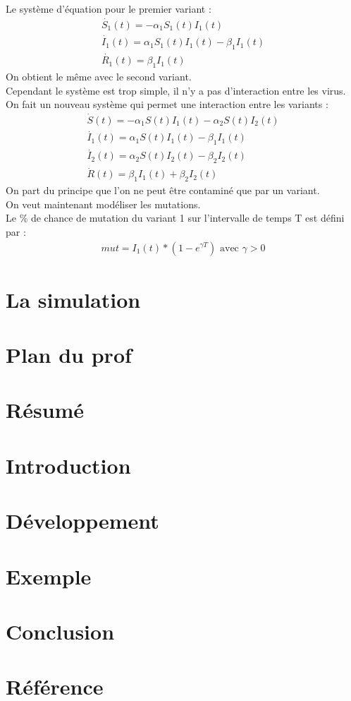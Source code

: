 \documentclass{article}
\begin{document}
Le système d'équation pour le premier variant : 
\begin{align}
    \dot{S_1}(t)= -\alpha_1 S_1(t)I_1(t) \\
    \dot{I_1}(t)= \alpha_1 S_1(t)I_1(t)-\beta_1 I_1(t) \\
    \dot{R_1}(t)= \beta_1 I_1(t)
\end{align}
On obtient le même avec le second variant. \\
Cependant le système est trop simple, il n'y a pas d'interaction entre les virus. \\
On fait un nouveau système qui permet une interaction entre les variants :
\begin{align}
    \dot{S}(t)= -\alpha_1 S(t)I_1(t) - \alpha_2 S(t)I_2(t) \\
    \dot{I_1}(t)= \alpha_1 S(t)I_1(t)-\beta_1 I_1(t) \\
    \dot{I_2}(t)= \alpha_2 S(t)I_2(t)-\beta_2 I_2(t) \\
    \dot{R}(t)= \beta_1 I_1(t) + \beta_2 I_2(t)
\end{align}
On part du principe que l'on ne peut être contaminé que par un variant. \\
On veut maintenant modéliser les mutations.\\
Le \% de chance de mutation du variant 1 sur l'intervalle de temps T est défini par :
\begin{align}
    mut = I_1(t)*(1-e^{\gamma T})\text{ avec }\gamma > \text{0}
\end{align}

\section{La simulation}



\section{Plan du prof}

\section{Résumé}

\section{Introduction}

\section{Développement}

\section{Exemple}

\section{Conclusion}

\section{Référence}
\end{document}
